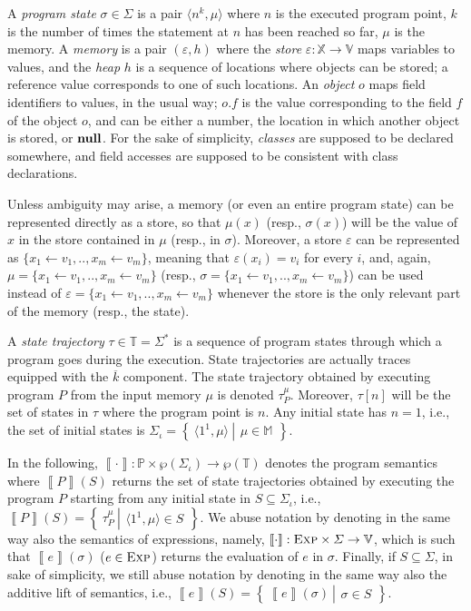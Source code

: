 \documentclass[prodmode,acmtocl]{acmsmall}
\def\prog{\ensuremath{P}\xspace}
\def\progs{\ensuremath{\mathbb{P}}\xspace}
\def\state{\ensuremath{\sigma}\xspace}
\def\states{\ensuremath{\Sigma}\xspace}
\def\istates{\ensuremath{\Sigma_\iota}\xspace}
\def\trace{\ensuremath{\tau}\xspace}
\def\traces{\ensuremath{\mathbb{T}}\xspace}
\def\values{\ensuremath{\mathbb{V}}\xspace}
\def\memory{\ensuremath{\mu}\xspace}
\def\memories{\ensuremath{\mathbb{M}}\xspace}
\def\store{\ensuremath{\varepsilon}\xspace}
\def\heap{\ensuremath{h}\xspace}
\newcommand{\BIND}[2]{#1\!\leftarrow\!#2}
\newcommand{\Var}{\mathbb{X}}
\newcommand{\ra}{\rightarrow}
\newcommand{\sset}[2]{\left\{~#1 ~ \left |
                               \begin{array}{l}#2\end{array}
                          \right.     \right\}}
\newcommand{\nil}{\mbox{\bf null}}
\def\tuple#1{\langle #1 \rangle}
\newcommand{\0}{\mbox{\bf 0}}
\newcommand{\SEMANTICS}[1]{\left\llbracket #1 \right\rrbracket}
\def\IMPEXP{{\mbox{\sc Exp}}}
\def\exp{e}
\begin{document}
A \emph{program state} $\state\in\states$ is a pair
$\tuple{n^k,\memory}$ where $n$ is the executed program point, $k$ is
the number of times the statement at $n$ has been reached so far,
$\memory$ is the memory.
A \emph{memory} is a pair $(\store,\heap)$ where the \emph{store}
$\store:\Var\ra\values$ maps variables to values, and the \emph{heap}
$\heap$ is a sequence of locations where objects can be stored; a
reference value corresponds to one of such locations.  An
\emph{object} $o$ maps field identifiers to values, in the usual way;
$o.f$ is the value corresponding to the field $f$ of the object $o$,
and can be either a number, the location in which another object is
stored, or $\nil$.  For the sake of simplicity, \emph{classes} are
supposed to be declared somewhere, and field accesses are supposed to
be consistent with class declarations.

Unless ambiguity may arise, a memory (or even an entire program state)
can be represented directly as a store, so that $\memory(x)$ (resp.,
$\state(x)$) will be the value of $x$ in the store contained in
$\memory$ (resp., in $\state$).  Moreover, a store $\store$ can be
represented as $\{ \BIND{x_1}{v_1}, .., \BIND{x_m}{v_m} \}$, meaning
that $\store(x_i) = v_i$ for every $i$, and, again, $\memory = \{
\BIND{x_1}{v_1}, .., \BIND{x_m}{v_m} \}$ (resp., $\state = \{
\BIND{x_1}{v_1}, .., \BIND{x_m}{v_m} \}$) can be used instead of
$\store = \{ \BIND{x_1}{v_1}, .., \BIND{x_m}{v_m} \}$ whenever the
store is the only relevant part of the memory (resp., the state).

A \emph{state trajectory} $\trace\in\traces=\states^*$ is a sequence
of program states through which a program goes during the execution.
State trajectories are actually traces equipped with the
$\overline{k}$ component.
The state trajectory obtained by executing program $\prog$ from the
input memory $\memory$ is denoted $\trace_\prog^\memory$.  Moreover,
$\trace[n]$ will be the set of states in $\trace$ where the program
point is $n$. Any initial state has $n=1$, i.e., the set of initial
states is
$\istates=\sset{\tuple{1^{1},\memory}}{\memory\in\memories}$.

In the following,
$\SEMANTICS{\cdot}:\progs\times\wp(\istates)\ra\wp(\traces)$ denotes
the program semantics where $\SEMANTICS{\prog}(S)$ returns the set of
state trajectories obtained by executing the program $\prog$ starting
from any initial state in $S\subseteq\istates$, i.e.,
$\SEMANTICS{\prog}(S)=\sset{\trace_\prog^\memory}{\tuple{1^{1},\memory}\in
  S}$.  We abuse notation by denoting in the same way also the
semantics of expressions, namely,
$\SEMANTICS{\cdot}:\IMPEXP\times\states\ra\values$, which is such that
$\SEMANTICS{\exp}(\state)$ ($\exp\in\IMPEXP$) returns the evaluation
of $\exp$ in $\state$.  Finally, if $S\subseteq\states$, in sake of
simplicity, we still abuse notation by denoting in the same way also
the additive lift of semantics, i.e.,
$\SEMANTICS{\exp}(S)=\sset{\SEMANTICS{\exp}(\state)}{\state\in S}$.
\end{document}
